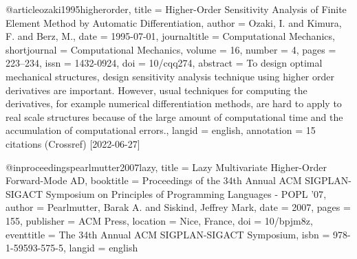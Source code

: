 @article{ozaki1995higherorder,
  title = {Higher-Order Sensitivity Analysis of Finite Element Method by Automatic Differentiation},
  author = {Ozaki, I. and Kimura, F. and Berz, M.},
  date = {1995-07-01},
  journaltitle = {Computational Mechanics},
  shortjournal = {Computational Mechanics},
  volume = {16},
  number = {4},
  pages = {223--234},
  issn = {1432-0924},
  doi = {10/cqq274},
  abstract = {To design optimal mechanical structures, design sensitivity analysis technique using higher order derivatives are important. However, usual techniques for computing the derivatives, for example numerical differentiation methods, are hard to apply to real scale structures because of the large amount of computational time and the accumulation of computational errors.},
  langid = {english},
  annotation = {15 citations (Crossref) [2022-06-27]}
}

@inproceedings{pearlmutter2007lazy,
  title = {Lazy Multivariate Higher-Order Forward-Mode {{AD}}},
  booktitle = {Proceedings of the 34th Annual {{ACM SIGPLAN-SIGACT}} Symposium on {{Principles}} of Programming Languages  - {{POPL}} '07},
  author = {Pearlmutter, Barak A. and Siskind, Jeffrey Mark},
  date = {2007},
  pages = {155},
  publisher = {ACM Press},
  location = {Nice, France},
  doi = {10/bpjm8z},
  eventtitle = {The 34th Annual {{ACM SIGPLAN-SIGACT}} Symposium},
  isbn = {978-1-59593-575-5},
  langid = {english}
}

